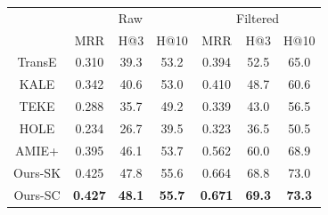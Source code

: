 \begin{table}[tbh]
	\centering
	\label{tab:link-pred-fb15k}
	\begin{tabular}{c|ccc|ccc}
		\hline
				&	\multicolumn{3}{c|}{Raw}
				&	\multicolumn{3}{c}{Filtered}	\\
		\cline{2-7}	
				&	MRR	&	H@3	&	H@10
				&	MRR	&	H@3	&	H@10	\\
		\hline
		TransE
				&	0.310			&	39.3	&	53.2
				&	0.394	&	52.5	&	65.0	\\	%
		KALE
				&	0.342	&	40.6	&	53.0
				&	0.410	&	48.7	&	60.6	\\	%
		TEKE
				&	0.288	&	35.7	&	49.2
				&	0.339	&	43.0	&	56.5	\\
		HOLE
				&	0.234	&	26.7	&	39.5
				&	0.323	& 	36.5	&	50.5	\\	%
		AMIE+
				&	0.395	&	46.1	&	53.7
				&	0.562	&	60.0	&	68.9	\\
		\hline
		Ours-SK
				&	0.425	&	47.8	&	55.6
				&	0.664	&	68.8	&	73.0	\\		%
		Ours-SC
				&	\textbf{0.427}		&	\textbf{48.1}	&	\textbf{55.7}
				&	\textbf{0.671}		&	\textbf{69.3}	&	\textbf{73.3}	\\		%
		\hline
	\end{tabular}
\end{table}

